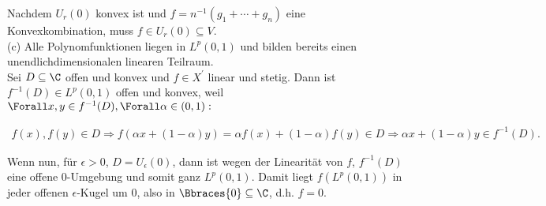 \begin{solution}
Nachdem $U_r(0)$ konvex ist und $f = n^{-1}(g_1 + \cdots + g_n)$ eine Konvexkombination, muss $f \in U_r(0) \subseteq V$. \\

(c)
Alle Polynomfunktionen liegen in $L^p(0, 1)$ und bilden bereits einen unendlichdimensionalen linearen Teilraum. \\

Sei $D \subseteq \C$ offen und konvex und $f \in X^\prime$ linear und stetig. Dann ist $f^{-1}(D) \in L^p(0, 1)$ offen und konvex, weil $\Forall x, y \in f^{-1}(D), \Forall \alpha \in (0, 1):$

\begin{align*}
  f(x), f(y) \in D
  \Rightarrow
  f(\alpha x + (1 - \alpha) y)
  =
  \alpha f(x) + (1 - \alpha) f(y) \in D
  \Rightarrow
  \alpha x + (1 - \alpha) y \in f^{-1}(D).
\end{align*}

Wenn nun, für $\epsilon > 0$, $D = U_\epsilon(0)$, dann ist wegen der Linearität von $f$, $f^{-1}(D)$ eine offene $0$-Umgebung und somit ganz $L^p(0, 1)$. Damit liegt $f(L^p(0, 1))$ in jeder offenen $\epsilon$-Kugel um $0$, also in $\Bbraces{0} \subseteq \C$, d.h. $f = 0$.

\end{solution}
